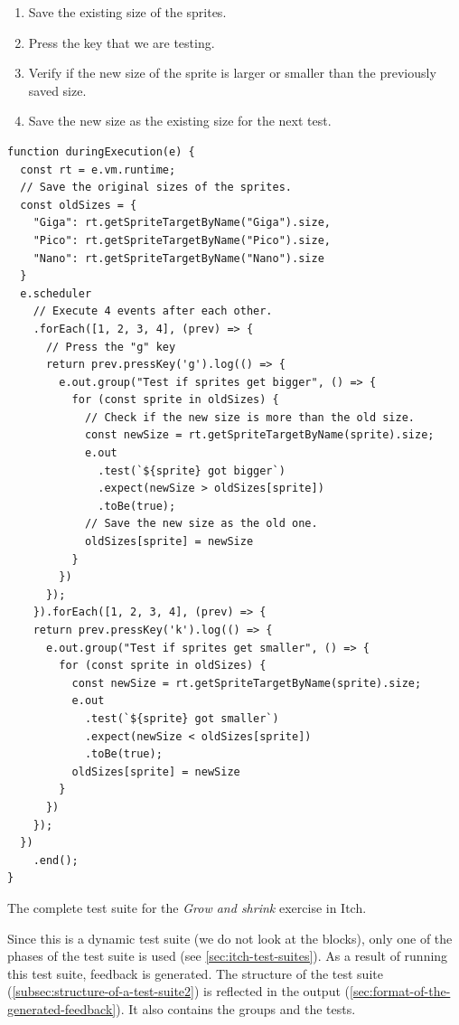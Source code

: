\documentclass[../main]{subfiles}
\begin{document}
\begin{enumerate}[noitemsep]
    \item Save the existing size of the sprites.
    \item Press the key that we are testing.
    \item Verify if the new size of the sprite is larger or smaller than the previously saved size.
    \item Save the new size as the existing size for the next test.
\end{enumerate}

\begin{listing}
    \begin{verbatim}
function duringExecution(e) {
  const rt = e.vm.runtime;
  // Save the original sizes of the sprites.
  const oldSizes = {
    "Giga": rt.getSpriteTargetByName("Giga").size,
    "Pico": rt.getSpriteTargetByName("Pico").size,
    "Nano": rt.getSpriteTargetByName("Nano").size
  }
  e.scheduler
    // Execute 4 events after each other.
    .forEach([1, 2, 3, 4], (prev) => {
      // Press the "g" key
      return prev.pressKey('g').log(() => {
        e.out.group("Test if sprites get bigger", () => {
          for (const sprite in oldSizes) {
            // Check if the new size is more than the old size.
            const newSize = rt.getSpriteTargetByName(sprite).size;
            e.out
              .test(`${sprite} got bigger`)
              .expect(newSize > oldSizes[sprite])
              .toBe(true);
            // Save the new size as the old one.
            oldSizes[sprite] = newSize
          }
        })
      });
    }).forEach([1, 2, 3, 4], (prev) => {
    return prev.pressKey('k').log(() => {
      e.out.group("Test if sprites get smaller", () => {
        for (const sprite in oldSizes) {
          const newSize = rt.getSpriteTargetByName(sprite).size;
          e.out
            .test(`${sprite} got smaller`)
            .expect(newSize < oldSizes[sprite])
            .toBe(true);
          oldSizes[sprite] = newSize
        }
      })
    });
  })
    .end();
}
    \end{verbatim}
    \caption{The complete test suite for the \emph{Grow and shrink} exercise in Itch.}
    \label{lst:itch-grow-and-shrink}
\end{listing}

Since this is a dynamic test suite (we do not look at the blocks), only one of the phases of the test suite is used (see \cref{sec:itch-test-suites}).
As a result of running this test suite, feedback is generated.
The structure of the test suite (\cref{subsec:structure-of-a-test-suite2}) is reflected in the output (\cref{sec:format-of-the-generated-feedback}).
It also contains the groups and the tests.
\end{document}
